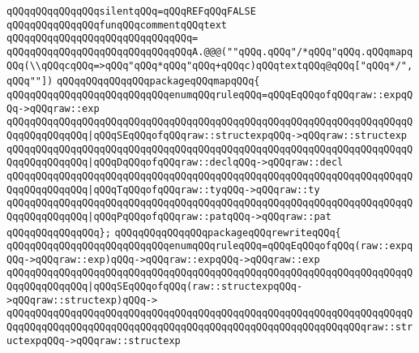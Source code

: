 \newline
\verb|qQQqqQQqqQQqqQQqsilentqQQq=qQQqREFqQQqFALSE|\newline
\newline
\verb|qQQqqQQqqQQqqQQqfunqQQqcommentqQQqtext|\newline
\verb|qQQqqQQqqQQqqQQqqQQqqQQqqQQqqQQq=|\newline
\verb|qQQqqQQqqQQqqQQqqQQqqQQqqQQqqQQqA.@@@(""qQQq.qQQq"/*qQQq"qQQq.qQQqmapqQQq(\\qQQqcqQQq=>qQQq"qQQq*qQQq"qQQq+qQQqc)qQQqtextqQQq@qQQq["qQQq*/",qQQq""])|\newline
\newline
\verb|qQQqqQQqqQQqqQQqpackageqQQqmapqQQq{|\newline
\newline
\verb|qQQqqQQqqQQqqQQqqQQqqQQqqQQqenumqQQqruleqQQq=qQQqEqQQqofqQQqraw::expqQQq->qQQqraw::exp|\newline
\verb|qQQqqQQqqQQqqQQqqQQqqQQqqQQqqQQqqQQqqQQqqQQqqQQqqQQqqQQqqQQqqQQqqQQqqQQqqQQqqQQqqQQq|\verb#|qQQqSEqQQqofqQQqraw::structexpqQQq->qQQqraw::structexp#\newline
\verb|qQQqqQQqqQQqqQQqqQQqqQQqqQQqqQQqqQQqqQQqqQQqqQQqqQQqqQQqqQQqqQQqqQQqqQQqqQQqqQQqqQQq|\verb#|qQQqDqQQqofqQQqraw::declqQQq->qQQqraw::decl#\newline
\verb|qQQqqQQqqQQqqQQqqQQqqQQqqQQqqQQqqQQqqQQqqQQqqQQqqQQqqQQqqQQqqQQqqQQqqQQqqQQqqQQqqQQq|\verb#|qQQqTqQQqofqQQqraw::tyqQQq->qQQqraw::ty#\newline
\verb|qQQqqQQqqQQqqQQqqQQqqQQqqQQqqQQqqQQqqQQqqQQqqQQqqQQqqQQqqQQqqQQqqQQqqQQqqQQqqQQqqQQq|\verb#|qQQqPqQQqofqQQqraw::patqQQq->qQQqraw::pat#\newline
\verb|qQQqqQQqqQQqqQQq};|\newline
\newline
\verb|qQQqqQQqqQQqqQQqpackageqQQqrewriteqQQq{|\newline
\newline
\verb|qQQqqQQqqQQqqQQqqQQqqQQqqQQqenumqQQqruleqQQq=qQQqEqQQqofqQQq(raw::expqQQq->qQQqraw::exp)qQQq->qQQqraw::expqQQq->qQQqraw::exp|\newline
\verb|qQQqqQQqqQQqqQQqqQQqqQQqqQQqqQQqqQQqqQQqqQQqqQQqqQQqqQQqqQQqqQQqqQQqqQQqqQQqqQQqqQQq|\verb#|qQQqSEqQQqofqQQq(raw::structexpqQQq->qQQqraw::structexp)qQQq->#\newline
\verb|qQQqqQQqqQQqqQQqqQQqqQQqqQQqqQQqqQQqqQQqqQQqqQQqqQQqqQQqqQQqqQQqqQQqqQQqqQQqqQQqqQQqqQQqqQQqqQQqqQQqqQQqqQQqqQQqqQQqqQQqqQQqqQQqqQQqraw::structexpqQQq->qQQqraw::structexp|\newline
